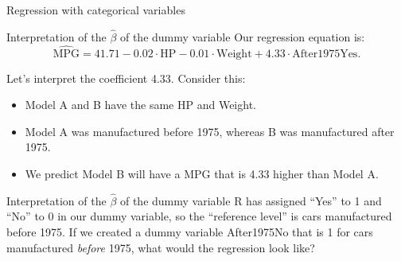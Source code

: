 \documentclass{beamer}\usepackage[]{graphicx}\usepackage[]{color}
\newenvironment{knitrout}{}{} %
\begin{document}
\begin{darkframes}
\begin{frame}[fragile]{Regression with categorical variables}
\begin{knitrout}
\end{knitrout}
      \end{frame}
      
      
      
      \begin{frame}[fragile]{Interpretation of the $\hat\beta$ of the dummy variable}
        Our regression equation is:
        \[
          \widehat{\text{MPG}} = 41.71 -
          0.02 \cdot \text{HP} -
          0.01 \cdot \text{Weight} +
          4.33 \cdot \text{After1975Yes}.
        \] 
        \pause

        Let's interpret the coefficient 4.33.
        Consider this:
        \begin{itemize}[<+->]
          \item Model A and B have the same HP and Weight.
          \item Model A was manufactured before 1975, whereas B was manufactured after 1975.
          \item We predict Model B will have a MPG that is 4.33 higher than Model A.
        \end{itemize} 
        \lc
      \end{frame}
      
      
      
      
      \begin{frame}[fragile]{Interpretation of the $\hat\beta$ of the dummy variable}
        R has assigned ``Yes'' to 1 and ``No'' to 0 in our dummy variable, so the ``reference level'' is cars manufactured before 1975.
        \pause\bigskip
        If we created a dummy variable After1975No that is 1 for cars manufactured \emph{before} 1975, what would the regression look like?          
      \end{frame}
      
      
      
      
      
      
      

\end{darkframes}
\end{document}

